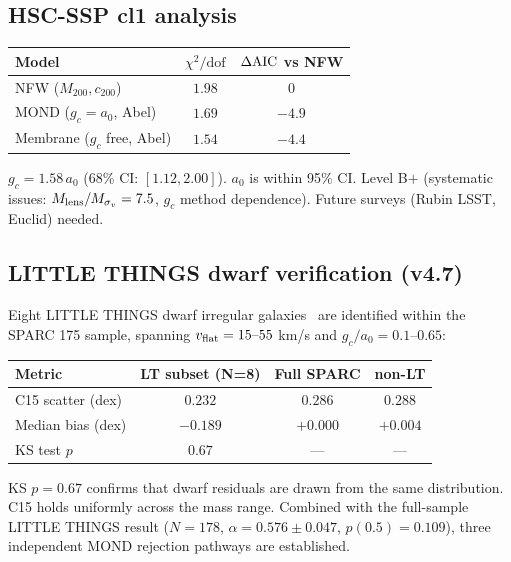 \documentclass[11pt,a4paper]{article}
\newcommand{\gc}{g_{c}}
\newcommand{\ao}{a_{0}}
\newcommand{\vflat}{v_{\rm flat}}
\newcommand{\AIC}{\Delta{\rm AIC}}
\newcommand{\chisq}{\chi^{2}}
\begin{document}
\subsection{HSC-SSP cl1 analysis}
\begin{center}\small
\begin{tabular}{@{}lcc@{}}
\toprule
Model & $\chisq/\text{dof}$ & $\AIC$ vs NFW \\
\midrule
NFW ($M_{200}, c_{200}$) & $1.98$ & $0$ \\
MOND ($\gc = \ao$, Abel) & $1.69$ & $-4.9$ \\
Membrane ($\gc$ free, Abel) & $1.54$ & $-4.4$ \\
\bottomrule
\end{tabular}
\end{center}
$\gc = 1.58\,\ao$ (68\% CI: $[1.12, 2.00]$). $\ao$ is within 95\% CI. Level B$+$ (systematic issues:
$M_{\rm lens}/M_{\sigma_v} = 7.5$, $\gc$ method dependence). Future surveys (Rubin LSST, Euclid) needed.

\subsection{LITTLE THINGS dwarf verification (v4.7)}
Eight LITTLE THINGS dwarf irregular galaxies~\citep{Oh2015} are identified within the SPARC 175 sample,
spanning $\vflat = 15\text{--}55$ km/s and $\gc/\ao = 0.1\text{--}0.65$:

\begin{center}\small
\begin{tabular}{@{}lccc@{}}
\toprule
Metric & LT subset (N=8) & Full SPARC & non-LT \\
\midrule
C15 scatter (dex) & $0.232$ & $0.286$ & $0.288$ \\
Median bias (dex) & $-0.189$ & $+0.000$ & $+0.004$ \\
KS test $p$ & $0.67$ & --- & --- \\
\bottomrule
\end{tabular}
\end{center}

KS $p = 0.67$ confirms that dwarf residuals are drawn from the same distribution. C15 holds uniformly across
the mass range. Combined with the full-sample LITTLE THINGS result ($N = 178$, $\alpha = 0.576 \pm 0.047$,
$p(0.5) = 0.109$), three independent MOND rejection pathways are established.
\end{document}
